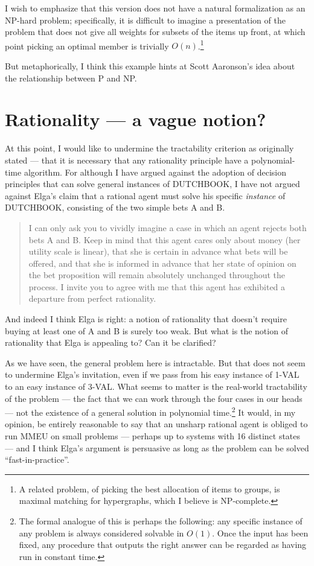 \documentclass[letterpaper,12pt]{article}
\begin{document}
I wish to emphasize that this version does not have a natural formalization as an NP-hard problem; specifically, it is difficult to imagine a presentation of the problem that does not give all weights for subsets of the items up front, at which point picking an optimal member is trivially $O(n)$.\footnote{A related problem, of picking the best allocation of items to groups, is maximal matching for hypergraphs, which I believe is NP-complete.}

But metaphorically, I think this example hints at Scott Aaronson's idea about the relationship between P and NP.

\section{Rationality --- a vague notion?}
At this point, I would like to undermine the tractability criterion as originally stated --- that it is necessary that any rationality principle have a polynomial-time algorithm. For although I have argued against the adoption of decision principles that can solve general instances of DUTCHBOOK, I have not argued against Elga's claim that a rational agent must solve his specific \emph{instance} of DUTCHBOOK, consisting of the two simple bets A and B.
\begin{quote}
I can only ask you to vividly imagine a case in which an agent rejects both bets A and B. Keep in mind that this agent cares only about money (her utility scale is linear), that she is certain in advance what bets will be offered, and that she is informed in advance that her state of opinion on the bet proposition will remain absolutely unchanged throughout the process. I invite you to agree with me that this agent has exhibited a departure from perfect rationality.
\end{quote}
And indeed I think Elga is right: a notion of rationality that doesn't require buying at least one of A and B is surely too weak. But what is the notion of rationality that Elga is appealing to? Can it be clarified?

As we have seen, the general problem here is intractable. But that does not seem to undermine Elga's invitation, even if we pass from his easy instance of 1-VAL to an easy instance of 3-VAL. What seems to matter is the real-world tractability of the problem --- the fact that we can work through the four cases in our heads --- not the existence of a general solution in polynomial time.\footnote{The formal analogue of this is perhaps the following: any specific instance of any problem is always considered solvable in $O(1)$. Once the input has been fixed, any procedure that outputs the right answer can be regarded as having run in constant time.} It would, in my opinion, be entirely reasonable to say that an unsharp rational agent is obliged to run MMEU on small problems --- perhaps up to systems with 16 distinct states --- and I think Elga's argument is persuasive as long as the problem can be solved ``fast-in-practice''.
\end{document}
